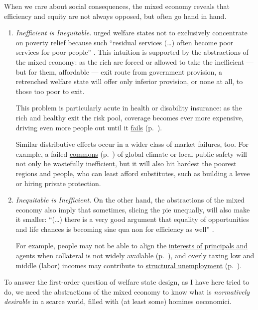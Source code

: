 \begin{enumerate}
	When we care about social consequences, the mixed economy reveals that efficiency and equity are not always opposed, but often go hand in hand.

	\begin{enumerate}
		\item \emph{Inefficient is Inequitable.}
		\citeauthor{Titmuss1974} urged welfare states not to exclusively concentrate on poverty relief because such ``residual services (\ldots) often become poor services for poor people'' \citeyearpar[134]{Titmuss1974}.
		This intuition is supported by the abstractions of the mixed economy:
		as the rich are forced or allowed to take the inefficient --- but for them, affordable --- exit route from government provision, a retrenched welfare state will offer only inferior provision, or none at all, to those too poor to exit.

		This problem is particularly acute in health or disability insurance:
		as the rich and healthy exit the risk pool, coverage becomes ever more expensive, driving even more people out until it \hyperref[sec:adverse-selection]{fails} (p.~\pageref{sec:adverse-selection}).

		Similar distributive effects occur in a wider class of market failures, too.
		For example, a failed \hyperref[sec:common-good]{commons} (p.~\pageref{sec:common-good}) of global climate or local public safety will not only be wastefully inefficient, but it will also hit hardest the poorest regions and people, who can least afford substitutes, such as building a levee or hiring private protection.

		\item \emph{Inequitable is Inefficient.}
		On the other hand, the abstractions of the mixed economy also imply that sometimes, slicing the pie unequally, will also make it smaller:
		``(\ldots) there is a very good argument that equality of opportunities and life chances is becoming sine qua non for efficiency as well'' \citep[ix]{Esping-Andersen2002}.

		For example, people may not be able to align the \hyperref[sec:principal-agent-problem]{interests of principals and agents} when collateral is not widely available (p.~\pageref{sec:principal-agent-problem}), and overly taxing low and middle (labor) incomes may contribute to \hyperref[sec:minimal-DWL]{structural unemployment} (p.~\pageref{sec:minimal-DWL}).
	\end{enumerate}

	To answer the first-order question of welfare state design, as I have here tried to do, we need the abstractions of the mixed economy to know what is \emph{normatively desirable} in a scarce world, filled with (at least some) homines oeconomici.
\end{enumerate}

